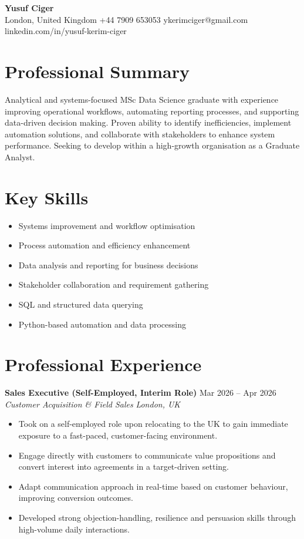 \documentclass[11pt, a4paper]{article}
\newcommand{\entry}[4]{
  \noindent\textbf{#1} \hfill {\footnotesize #2} \\
  \textit{#3} \hfill \textit{#4}
  \vspace{4pt}
}
\begin{document}
\begin{center}
    {\Large \textbf{Yusuf Ciger}} \\[0.2cm]
    London, United Kingdom \textbar \quad
    +44 7909 653053 \textbar \quad
    ykerimciger@gmail.com \textbar \quad
    linkedin.com/in/yusuf-kerim-ciger
\end{center}

\vspace{-0.3cm}

\section{Professional Summary}

Analytical and systems-focused MSc Data Science graduate with experience improving operational workflows, automating reporting processes, and supporting data-driven decision making. Proven ability to identify inefficiencies, implement automation solutions, and collaborate with stakeholders to enhance system performance. Seeking to develop within a high-growth organisation as a Graduate Analyst.

\section{Key Skills}

\begin{itemize}[noitemsep, topsep=0pt, leftmargin=1.5em]
    \item Systems improvement and workflow optimisation
    \item Process automation and efficiency enhancement
    \item Data analysis and reporting for business decisions
    \item Stakeholder collaboration and requirement gathering
    \item SQL and structured data querying
    \item Python-based automation and data processing
\end{itemize}

\section{Professional Experience}

\entry{Sales Executive (Self-Employed, Interim Role)}{Mar 2026 -- Apr 2026}
{Customer Acquisition \& Field Sales}{London, UK}

\begin{itemize}[noitemsep, topsep=0pt]
    \item Took on a self-employed role upon relocating to the UK to gain immediate exposure to a fast-paced, customer-facing environment.
    \item Engage directly with customers to communicate value propositions and convert interest into agreements in a target-driven setting.
    \item Adapt communication approach in real-time based on customer behaviour, improving conversion outcomes.
    \item Developed strong objection-handling, resilience and persuasion skills through high-volume daily interactions.
\end{itemize}
\end{document}
